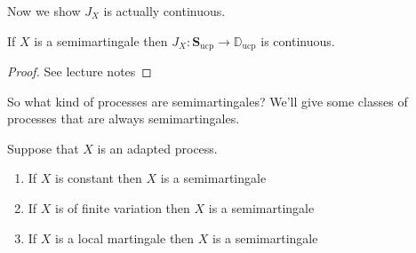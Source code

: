 \documentclass{scrreprt}
\theoremstyle{remark}
\newcommand{\simpro}{\mathbf S}
\newcommand{\cadspace}{\mathbb D}
\newcommand{\ucp}{\text{ucp}}
\begin{document}
Now we show $J_X$ is actually continuous.

\begin{thm}
	If $X$ is a semimartingale then $J_X: \simpro_{\ucp} \to \cadspace_{\ucp}$ is continuous.
\end{thm}
\begin{proof}
	See lecture notes
\end{proof}
So what kind of processes are semimartingales? We'll give some classes of processes that are always semimartingales.

\begin{prop}
	\label{prop:semi-examples}
	Suppose that $X$ is an \cadlag{} adapted process.
	\begin{enumerate}
		\item If $X$ is constant then $X$ is a semimartingale
		\item If $X$ is of finite variation then $X$ is a semimartingale
		\item If $X$ is a local martingale then $X$ is a semimartingale
	\end{enumerate}
\end{prop}
\end{document}
